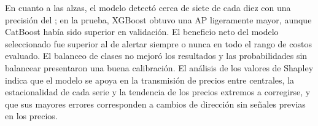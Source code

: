 En cuanto a las alzas, el modelo detectó cerca de siete de cada diez con una precisión del \cprece\pct; en la prueba, XGBoost obtuvo una AP ligeramente mayor, aunque CatBoost había sido superior en validación. El beneficio neto del modelo seleccionado fue superior al de alertar siempre o nunca en todo el rango de costos evaluado. El balanceo de clases no mejoró los resultados y las probabilidades sin balancear presentaron una buena calibración. El análisis de los valores de Shapley indica que el modelo se apoya en la transmisión de precios entre centrales, la estacionalidad de cada serie y la tendencia de los precios extremos a corregirse, y que sus mayores errores corresponden a cambios de dirección sin señales previas en los precios.

\FloatBarrier
